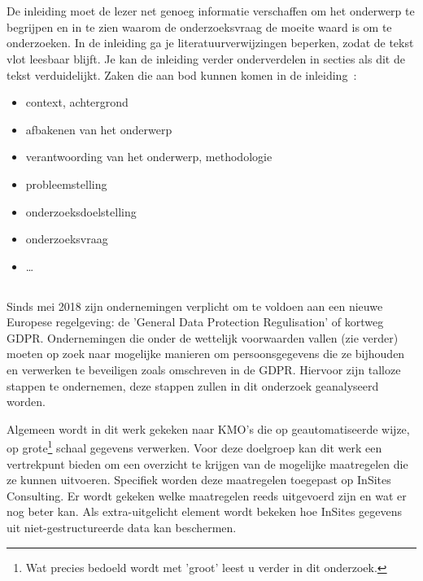 
\chapter{}
\label{ch:inleiding}

De inleiding moet de lezer net genoeg informatie verschaffen om het onderwerp te begrijpen en in te zien waarom de onderzoeksvraag de moeite waard is om te onderzoeken. In de inleiding ga je literatuurverwijzingen beperken, zodat de tekst vlot leesbaar blijft. Je kan de inleiding verder onderverdelen in secties als dit de tekst verduidelijkt. Zaken die aan bod kunnen komen in de inleiding~\autocite{Pollefliet2011}:

\begin{itemize}
  \item context, achtergrond
  \item afbakenen van het onderwerp
  \item verantwoording van het onderwerp, methodologie
  \item probleemstelling
  \item onderzoeksdoelstelling
  \item onderzoeksvraag
  \item \ldots
\end{itemize}

\section{}
\label{sec:probleemstelling}
Sinds mei 2018 zijn ondernemingen verplicht om te voldoen aan een nieuwe Europese regelgeving: de 'General Data Protection Regulisation' of kortweg GDPR. 
Ondernemingen die onder de wettelijk voorwaarden vallen (zie verder) moeten op zoek naar mogelijke manieren om persoonsgegevens die ze bijhouden en verwerken te beveiligen zoals omschreven in de GDPR. Hiervoor zijn talloze stappen te ondernemen, deze stappen zullen in dit onderzoek geanalyseerd worden. 

Algemeen wordt in dit werk gekeken naar KMO's die op geautomatiseerde wijze, op grote\footnote{Wat precies bedoeld wordt met 'groot' leest u verder in dit onderzoek.} schaal gegevens verwerken. 
Voor deze doelgroep kan dit werk een vertrekpunt bieden om een overzicht te krijgen van de mogelijke maatregelen die ze kunnen uitvoeren. 
Specifiek worden deze maatregelen toegepast op InSites Consulting. Er wordt gekeken welke maatregelen reeds uitgevoerd zijn en wat er nog beter kan. 
Als extra-uitgelicht element wordt bekeken hoe InSites gegevens uit niet-gestructureerde data kan beschermen. 

